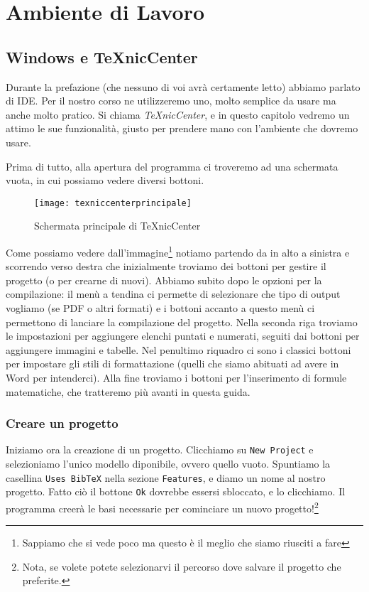 \chapter{ Ambiente di Lavoro}

\section{Windows e TeXnicCenter}

Durante la prefazione (che nessuno di voi avr\`a certamente letto) abbiamo
parlato di IDE. Per il nostro corso ne utilizzeremo uno, molto semplice da
usare ma anche molto pratico. Si chiama \textit{TeXnicCenter}, e in questo
capitolo vedremo un attimo le sue funzionalit\`a, giusto per prendere mano
con l'ambiente che dovremo usare.

Prima di tutto, alla apertura del programma ci troveremo ad una schermata
vuota, in cui possiamo vedere diversi bottoni.

\begin{figure}[H]
  \centering
  \texttt{[image: texniccenterprincipale]}
  \caption{Schermata principale di TeXnicCenter}
\end{figure}

Come possiamo vedere dall'immagine\footnote{Sappiamo che si vede poco
ma questo \`e il meglio che siamo riusciti a fare} notiamo partendo da in alto
a sinistra e scorrendo verso destra che inizialmente troviamo dei bottoni per
gestire il progetto (o per crearne di nuovi).
Abbiamo subito dopo le opzioni per la compilazione: il men\`u a tendina ci
permette di selezionare che tipo di output vogliamo (se PDF o altri formati) e
i bottoni accanto a questo men\`u ci permettono di lanciare la compilazione
del progetto.
Nella seconda riga troviamo le impostazioni per aggiungere elenchi puntati e
numerati, seguiti dai bottoni per aggiungere immagini e tabelle. Nel penultimo
riquadro ci sono i classici bottoni per impostare gli stili di formattazione
(quelli che siamo abituati ad avere in Word per intenderci).
Alla fine troviamo i bottoni per l'inserimento di formule matematiche, che
tratteremo pi\`u avanti in questa guida.

\subsection{Creare un progetto}

Iniziamo ora la creazione di un progetto.
Clicchiamo su \texttt{New Project} e selezioniamo l'unico modello diponibile,
ovvero quello vuoto. Spuntiamo la casellina \texttt{Uses BibTeX} nella sezione
\texttt{Features}, e diamo un nome al nostro progetto. Fatto ci\`o il bottone
\texttt{Ok} dovrebbe essersi sbloccato, e lo clicchiamo. Il programma creer\`a
le basi necessarie per cominciare un nuovo progetto!\footnote{Nota, se volete
potete selezionarvi il percorso dove salvare il progetto che preferite.}